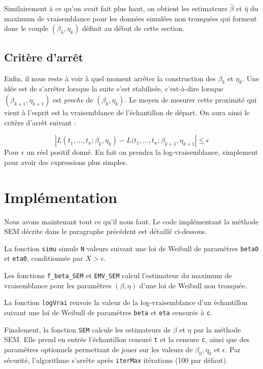 \documentclass[a4paper]{report}
\begin{document}
Similairement à ce qu'on avait fait plus haut, on obtient les estimateurs $\hat{\beta}$ et $\hat{\eta}$ du maximum de vraisemblance pour les données simulées non tronquées qui forment donc le couple $(\beta_k,\eta_k)$ définit au début de cette section. 


\subsection{Critère d'arrêt}

Enfin, il nous reste à voir à quel moment arrêter la construction des $\beta_k$ et $\eta_k$. 
Une idée est de s'arrêter lorsque la suite s'est stabilisée, c'est-à-dire lorsque $(\beta_{k+1},\eta_{k+1})$ est \emph{proche} de $(\beta_k,\eta_k)$. Le moyen de mesurer cette proximité qui vient à l'esprit est la vraisemblance de l'échantillon de départ. On aura ainsi le critère d'arrêt suivant : 

\[ | L(t_1,...,t_n;\beta_k,\eta_k) - L(t_1,...,t_n;\beta_{k+1},\eta_{k+1} | \leq \epsilon \]
Pour $\epsilon$ un réel positif donné. En fait on prendra la log-vraisemblance, simplement pour
avoir des expressions plus simples.

\section{Implémentation}

Nous avons maintenant tout ce qu'il nous faut. Le code implémentant la méthode SEM décrite dans le paragraphe précédent est détaillé ci-dessous.

La fonction \verb|simu| simule \verb|N| valeurs suivant une loi de Weibull de paramètres \verb|beta0| et \verb|eta0|, conditionnée par $X>c$.



Les fonctions \verb|f_beta_SEM| et \verb|EMV_SEM| calcul l'estimateur du maximum de vraisemblance pour les paramètres $(\beta,\eta)$ d'une loi de Weibull non tronquée. 


La fonction \verb|logVrai| renvoie la valeur de la log-vraisemblance d'un échantillon suivant une loi de Weibull de paramètres \verb|beta| et \verb|eta| censurée à \verb|c|.


Finalement, la fonction \verb|SEM| calcule les estimateurs de $\beta$ et $\eta$ par la méthode SEM. Elle prend en entrée l'échantillon censuré \verb|t| et la censure \verb|c|, ainsi que des paramètres optionnels permettant de jouer sur les valeurs de $\beta_0, \eta_0$ et $\epsilon$. Par sécurité, l'algorithme s'arrête après \verb|iterMax| itérations (100 par défaut).
 
 
\end{document}

